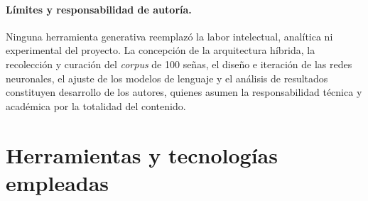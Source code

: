 \paragraph{Límites y responsabilidad de autoría.}
Ninguna herramienta generativa reemplazó la labor intelectual, analítica ni experimental del proyecto. La concepción de la arquitectura híbrida, la recolección y curación del \textit{corpus} de 100 señas, el diseño e iteración de las redes neuronales, el ajuste de los modelos de lenguaje y el análisis de resultados constituyen desarrollo de los autores, quienes asumen la responsabilidad técnica y académica por la totalidad del contenido.

\section{Herramientas y tecnologías empleadas}

